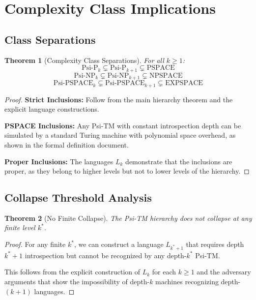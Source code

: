 \documentclass[11pt]{article}
\newtheorem{theorem}{Theorem}
\begin{document}
\section{Complexity Class Implications}

\subsection{Class Separations}

\begin{theorem}[Complexity Class Separations]
For all $k \geq 1$:
$$\text{Psi-P}_k \subsetneq \text{Psi-P}_{k+1} \subsetneq \text{PSPACE}$$
$$\text{Psi-NP}_k \subsetneq \text{Psi-NP}_{k+1} \subsetneq \text{NPSPACE}$$
$$\text{Psi-PSPACE}_k \subsetneq \text{Psi-PSPACE}_{k+1} \subsetneq \text{EXPSPACE}$$
\end{theorem}

\begin{proof}
\textbf{Strict Inclusions:}
Follow from the main hierarchy theorem and the explicit language constructions.

\textbf{PSPACE Inclusions:}
Any Psi-TM with constant introspection depth can be simulated by a standard Turing machine with polynomial space overhead, as shown in the formal definition document.

\textbf{Proper Inclusions:}
The languages $L_k$ demonstrate that the inclusions are proper, as they belong to higher levels but not to lower levels of the hierarchy.
\end{proof}

\subsection{Collapse Threshold Analysis}

\begin{theorem}[No Finite Collapse]
The Psi-TM hierarchy does not collapse at any finite level $k^*$.
\end{theorem}

\begin{proof}
For any finite $k^*$, we can construct a language $L_{k^*+1}$ that requires depth $k^*+1$ introspection but cannot be recognized by any depth-$k^*$ Psi-TM.

This follows from the explicit construction of $L_k$ for each $k \geq 1$ and the adversary arguments that show the impossibility of depth-$k$ machines recognizing depth-$(k+1)$ languages.
\end{proof}
\end{document}
